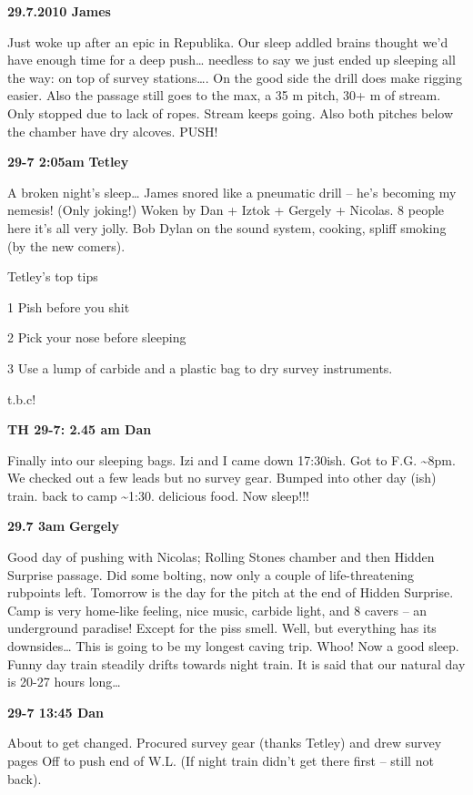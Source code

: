 \textbf{29.7.2010 James}

Just woke up after an epic in Republika. Our sleep addled brains thought
we'd have enough time for a deep push\ldots{} needless to say we just
ended up sleeping all the way: on top of survey stations\ldots{}. On the
good side the drill does make rigging easier. Also the passage still
goes to the max, a 35 m pitch, 30+ m of stream. Only stopped due to lack
of ropes. Stream keeps going. Also both pitches below the chamber have
dry alcoves. PUSH!

\textbf{29-7 2:05am} \textbf{Tetley}

A broken night's sleep\ldots{} James snored like a pneumatic drill --
he's becoming my nemesis! (Only joking!) Woken by Dan + Iztok + Gergely
+ Nicolas. 8 people here it's all very jolly. Bob Dylan on the sound
system, cooking, spliff smoking (by the new comers).

Tetley's top tips

1 Pish before you shit

2 Pick your nose before sleeping

3 Use a lump of carbide and a plastic bag to dry survey instruments.

t.b.c!

\textbf{TH 29-7: 2.45 am Dan}

Finally into our sleeping bags. Izi and I came down 17:30ish. Got to
F.G. \textasciitilde 8pm. We checked out a few leads but no survey gear.
Bumped into other day (ish) train. back to camp \textasciitilde 1:30.
delicious food. Now sleep!!!

\textbf{29.7 3am} \textbf{Gergely}

Good day of pushing with Nicolas; Rolling Stones chamber and then Hidden
Surprise passage. Did some bolting, now only a couple of
life-threatening rubpoints left. Tomorrow is the day for the pitch at
the end of Hidden Surprise. Camp is very home-like feeling, nice music,
carbide light, and 8 cavers -- an underground paradise! Except for the
piss smell. Well, but everything has its downsides\ldots{} This is going
to be my longest caving trip. Whoo! Now a good sleep. Funny day train
steadily drifts towards night train. It is said that our natural day is
20-27 hours long\ldots{}

\textbf{29-7 13:45 Dan}

About to get changed. Procured survey gear (thanks Tetley) and drew
survey pages Off to push end of W.L. (If night train didn't get there
first -- still not back).

